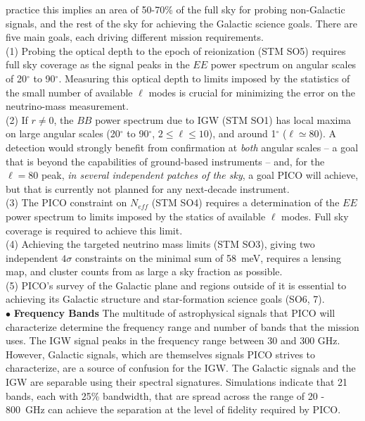 \documentclass[PICOReport.tex]{subfiles}
\begin{document}
practice this implies an area of 50-70\% of the full sky for probing non-Galactic signals, and the rest of the sky
for achieving the Galactic science goals. There are five main goals, each driving different mission requirements.\\
(1) Probing the optical depth to the epoch of reionization (STM SO5) requires full sky 
coverage as the signal peaks in the $EE$ power spectrum on angular scales of 20$^\circ$ to 90$^\circ$. Measuring 
this optical depth to limits imposed by the statistics of the small number of available $\ell$ modes is crucial 
for minimizing the error on the neutrino-mass measurement. \\   
(2) If $r \ne 0 $, the $BB$ power spectrum due to IGW (STM SO1) has local maxima on large angular scales
(20$^\circ$ to 90$^\circ$, $ 2 \leq \ell \leq 10$), and around 1$^\circ$ ($ \ell \simeq 80$). 
A detection would strongly benefit from confirmation at {\it both} angular 
scales -- a goal that is beyond the capabilities of ground-based instruments -- and, for the $\ell = 80$ peak, 
{\it in several independent patches of the sky}, a goal PICO will achieve, but that is currently not planned for 
any next-decade instrument.  \\
(3) The PICO constraint on $N_{eff}$ (STM SO4) requires a determination of the $EE$ power spectrum to limits
imposed by the statics of available $\ell$ modes. Full sky coverage is required to achieve this limit.  \\
(4) Achieving the targeted neutrino mass limits (STM SO3), giving two independent $4\sigma$ constraints on the minimal sum of 58~meV, requires
a lensing map, and cluster counts from as large a sky fraction as possible. \\
(5) PICO's survey of the Galactic plane and regions outside of it is essential to achieving its Galactic structure 
and star-formation science goals (SO6, 7). \\
%
$\bullet$ {\bf Frequency Bands} \hspace{0.1in} The multitude of astrophysical signals that PICO will characterize 
determine the frequency range and number of bands that the mission uses. The \ac{IGW} signal peaks 
in the frequency range between 30 and 300 GHz. However, Galactic signals, which are themselves signals PICO strives to 
characterize, are a source of confusion for the IGW. The Galactic signals and the IGW are separable using their 
spectral signatures. Simulations indicate that 21 bands, each with 25\% bandwidth, that are spread across 
the range of 20 - 800~GHz can achieve the separation at the level of fidelity required by PICO. 
\end{document}
